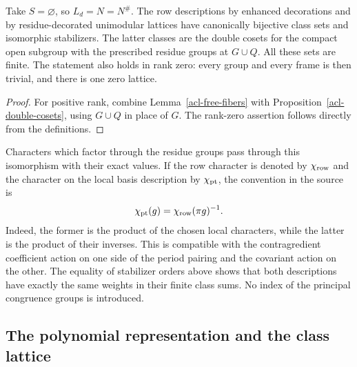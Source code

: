 \begin{corollary}
\label{acl-row-classes}
Take $S=\varnothing$, so $L_d=N=N^\#$. The row descriptions
by enhanced decorations and by residue-decorated unimodular
lattices have canonically bijective class sets and isomorphic
stabilizers. The latter classes are the double cosets for
the compact open subgroup with the prescribed residue groups
at $G\cup Q$. All these sets are finite. The statement also
holds in rank zero: every group and every frame is then
trivial, and there is one zero lattice.
\end{corollary}
\begin{proof}
For positive rank, combine Lemma~\ref{acl-free-fibers} with
Proposition~\ref{acl-double-cosets}, using $G\cup Q$ in place
of $G$. The rank-zero assertion follows directly from the
definitions.
\end{proof}

Characters which factor through the residue groups pass through
this isomorphism with their exact values. If the row character
is denoted by $\chi_{\rm row}$ and the character on the local
basis description by $\chi_{\rm pt}$, the convention in the
source is
\begin{equation}\label{acl-row-character}
              \chi_{\rm pt}(g)
                        =\chi_{\rm row}(\pi g)^{-1}.
\end{equation}
Indeed, the former is the product of the chosen local
characters, while the latter is the product of their inverses.
This is compatible with the contragredient coefficient action
on one side of the period pairing and the covariant action
on the other. The equality of stabilizer orders above shows
that both descriptions have exactly the same weights in
their finite class sums. No index of the principal congruence
groups is introduced.

\subsection{The polynomial representation and the class lattice}

